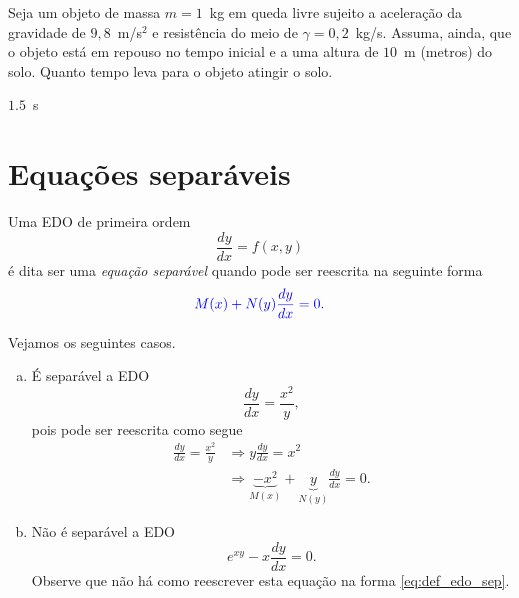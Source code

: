 \begin{exer}
  Seja um objeto de massa $m = 1$~kg em queda livre sujeito a aceleração da gravidade de $9,8$~m/s$^2$ e resistência do meio de $\gamma = 0,2$~kg/s. Assuma, ainda, que o objeto está em repouso no tempo inicial e a uma altura de $10$~m (metros) do solo. Quanto tempo leva para o objeto atingir o solo.
\end{exer}
\begin{resp}
  $1.5$~s
\end{resp}

\section{Equações separáveis}\label{cap_edo1ordem_sec_eqsep}

Uma EDO de primeira ordem
\begin{equation}
  \frac{dy}{dx} = f(x,y)
\end{equation}
é dita ser uma \emph{equação separável} quando pode ser reescrita na seguinte forma
\begin{equation}\label{eq:def_edo_sep}
  {\color{blue} M(x) + N(y)\frac{dy}{dx} = 0.}
\end{equation}

\begin{ex}\label{ex:edo_sep_def}
  Vejamos os seguintes casos.
  \begin{enumerate}[a)]
  \item É separável a EDO
    \begin{equation}
      \frac{dy}{dx} = \frac{x^2}{y},
    \end{equation}
    pois pode ser reescrita como segue
    \begin{align}
      \frac{dy}{dx} = \frac{x^2}{y} &\Rightarrow y\frac{dy}{dx} = x^2 \\
                                    &\Rightarrow \underbrace{-x^2}_{M(x)} + \underbrace{y}_{N(y)}\frac{dy}{dx} = 0.
    \end{align}
  \item Não é separável a EDO
    \begin{equation}
      e^{xy} - x\frac{dy}{dx} = 0.
    \end{equation}
    Observe que não há como reescrever esta equação na forma \eqref{eq:def_edo_sep}.
  \end{enumerate}
\end{ex}

